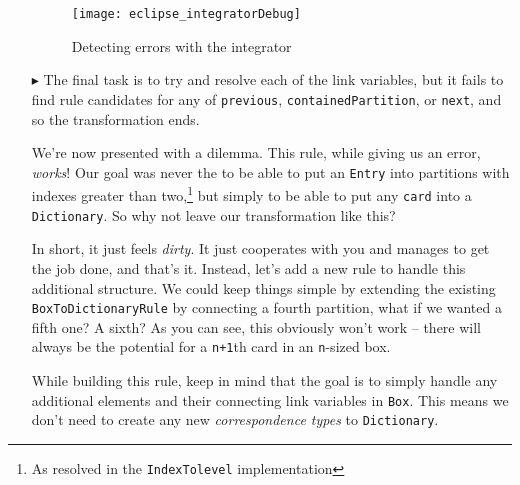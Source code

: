 \begin{itemize}
\begin{figure}[htb]
\begin{center}
  \texttt{[image: eclipse\_integratorDebug]}
  \caption{Detecting errors with the integrator}
  \label{fig:integrator_debugSuccess}
\end{center}
\end{figure}

\item[$\blacktriangleright$] The final task is to try and resolve each of the link variables, but it fails to find rule candidates for any of \texttt{previous},
\texttt{containedPartition}, or \texttt{next}, and so the transformation ends.

\clearpage

We're now presented with a dilemma. This rule, while giving us an error, \emph{works}! Our goal was never the to be able to put an \texttt{Entry} into
partitions with indexes greater than two,\footnote{As resolved in the \texttt{IndexTolevel} implementation} but simply to be able to put any \texttt{card} into
a \texttt{Dictionary}. So why not leave our transformation like this?

\vspace{0.5cm}

In short, it just feels \emph{dirty}. It just cooperates with you and manages to get the job done, and that's it. Instead, let's add a new rule to handle this
additional structure. We could keep things simple by extending the existing \texttt{BoxToDictionaryRule} by connecting a fourth partition, what if we wanted a
fifth one? A sixth? As you can see, this obviously won't work -- there will always be the potential for a \texttt{n+1}th card in an \texttt{n}-sized
box. 

\vspace{0.5cm}

While building this rule, keep in mind that the goal is to simply handle any additional elements and their connecting link variables in \texttt{Box}. This means
we don't need to create any new \emph{correspondence types} to \texttt{Dictionary}.

\end{itemize}







% 
